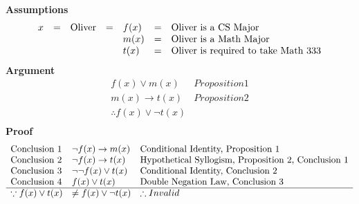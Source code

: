 \documentclass[letterpaper]{article}
\renewcommand\subsection{}
\begin{document}
    \section{}
    	\subsection{\bf Assumptions\sf}
   		\begin{displaymath}
          \begin{array}{lllllll}
                  x &=& $Oliver$ &=& f(x) &=& $Oliver is a CS Major$ \\
                  &&&& m(x) &=& $Oliver is a Math Major$ \\
                  &&&& t(x) &=& $Oliver is required to take Math 333$ \\
              \end{array}
          \end{displaymath}
        \subsection{\bf Argument\sf} 
          \begin{displaymath}
              \begin{array}{ll}
                  f(x) \vee m(x) & Proposition 1 \\
                  m(x) \rightarrow t(x) & Proposition 2 \\
                  \hline
                  \therefore f(x) \vee \neg t(x) &\\
              \end{array}
          \end{displaymath}
        \subsection{\bf Proof\sf}
          \begin{displaymath}
              \begin{array}{lll}
                  $Conclusion 1$ & \neg f(x) \rightarrow m(x) & $Conditional Identity, Proposition 1$ \\
                  $Conclusion 2$ & \neg f(x) \rightarrow t(x) & $Hypothetical Syllogism, Proposition 2, Conclusion 1$ \\
                  $Conclusion 3$ & \neg \neg f(x) \vee t(x) & $Conditional Identity, Conclusion 2$ \\
                  $Conclusion 4$ & f(x) \vee t(x) & $Double Negation Law, Conclusion 3$ \\
                  \hline
                  \because f(x) \vee t(x) & \neq f(x) \vee \neg t(x) & \therefore Invalid 
              \end{array}
          \end{displaymath}
\end{document}
